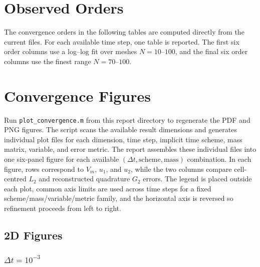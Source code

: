 \documentclass[11pt,a4paper]{article}
\newcommand{\code}[1]{\texttt{#1}}
\begin{document}
\section{Observed Orders}
The convergence orders in the following tables are computed directly from the current  files. For each available time step, one table is reported. The first six order columns use a log--log fit over meshes $N=10$--$100$, and the final six order columns use the finest range $N=70$--$100$.



\section{Convergence Figures}
Run \code{plot\_convergence.m} from this report directory to regenerate the PDF and PNG figures. The script scans the available result dimensions and generates individual plot files for each dimension, time step, implicit time scheme, mass matrix, variable, and error metric. The report assembles these individual files into one six-panel figure for each available $(\Delta t,\text{scheme},\text{mass})$ combination. In each figure, rows correspond to $V_m$, $u_1$, and $u_2$, while the two columns compare cell-centred $L_2$ and reconstructed quadrature $G_2$ errors. The legend is placed outside each plot, common axis limits are used across time steps for a fixed scheme/mass/variable/metric family, and the horizontal axis is reversed so refinement proceeds from left to right.

\subsection{2D Figures}

\subsubsection*{$\Delta t=10^{-3}$}
\end{document}
